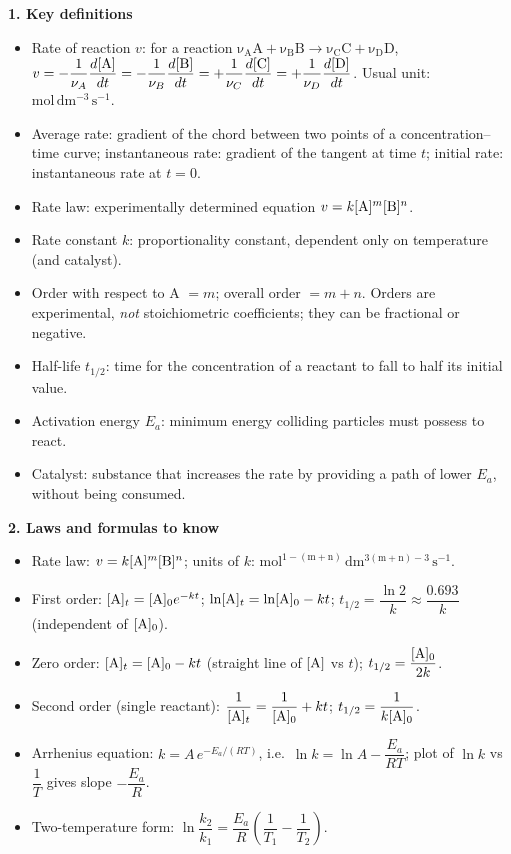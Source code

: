 \documentclass[11pt]{article}
\newcommand{\cle}[1]{{\popxbold\color{popdark}#1}}
\begin{document}
\begin{aretenir}

\textbf{1. Key definitions}
\begin{itemize}
\item \cle{Rate of reaction} $v$: for a reaction $\ensuremath{\mathrm{\nu_A A + \nu_B B \rightarrow  \nu_C C + \nu_D D}}$, 
$v = -\dfrac{1}{\nu_A}\dfrac{d[\ce{A}]}{dt} = -\dfrac{1}{\nu_B}\dfrac{d[\ce{B}]}{dt} = +\dfrac{1}{\nu_C}\dfrac{d[\ce{C}]}{dt} = +\dfrac{1}{\nu_D}\dfrac{d[\ce{D}]}{dt}$.
Usual unit: $\mathrm{mol\,dm^{-3}\,s^{-1}}$.
\item \cle{Average rate}: gradient of the chord between two points of a concentration–time curve; 
\cle{instantaneous rate}: gradient of the tangent at time $t$; 
\cle{initial rate}: instantaneous rate at $t=0$.
\item \cle{Rate law}: experimentally determined equation $v = k[\ce{A}]^{m}[\ce{B}]^{n}$.
\item \cle{Rate constant} $k$: proportionality constant, dependent only on temperature (and catalyst).
\item \cle{Order} with respect to A $= m$; \cle{overall order} $= m+n$. Orders are experimental, \emph{not} stoichiometric coefficients; they can be fractional or negative.
\item \cle{Half-life} $t_{1/2}$: time for the concentration of a reactant to fall to half its initial value.
\item \cle{Activation energy} $E_a$: minimum energy colliding particles must possess to react.
\item \cle{Catalyst}: substance that increases the rate by providing a path of lower $E_a$, without being consumed.
\end{itemize}

\textbf{2. Laws and formulas to know}
\begin{itemize}
\item Rate law: $v = k[\ce{A}]^{m}[\ce{B}]^{n}$; units of $k$: $\mathrm{mol^{1-(m+n)}\,dm^{3(m+n)-3}\,s^{-1}}$.
\item First order: $[\ce{A}]_t = [\ce{A}]_0 e^{-kt}$; $\ln[\ce{A}]_t = \ln[\ce{A}]_0 - kt$; $t_{1/2} = \dfrac{\ln 2}{k} \approx \dfrac{0.693}{k}$ (independent of $[\ce{A}]_0$).
\item Zero order: $[\ce{A}]_t = [\ce{A}]_0 - kt$ (straight line of $[\ce{A}]$ vs $t$); $t_{1/2} = \dfrac{[\ce{A}]_0}{2k}$.
\item Second order (single reactant): $\dfrac{1}{[\ce{A}]_t} = \dfrac{1}{[\ce{A}]_0} + kt$; $t_{1/2} = \dfrac{1}{k[\ce{A}]_0}$.
\item Arrhenius equation: $k = A\,e^{-E_a/(RT)}$, i.e.\ $\ln k = \ln A - \dfrac{E_a}{RT}$; plot of $\ln k$ vs $\dfrac{1}{T}$ gives slope $-\dfrac{E_a}{R}$.
\item Two-temperature form: $\ln\dfrac{k_2}{k_1} = \dfrac{E_a}{R}\left(\dfrac{1}{T_1} - \dfrac{1}{T_2}\right)$.
\end{itemize}


\end{aretenir}
\end{document}
